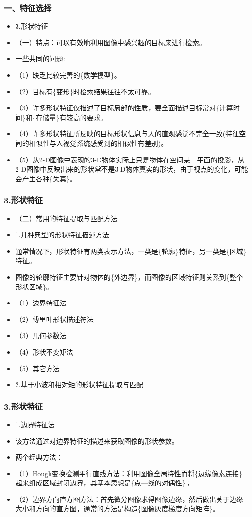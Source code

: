 \documentclass[notheorems,mathserif,table,compress]{beamer}  %
\begin{document}
\begin{frame}
  \frametitle{一、特征选择}
  \begin{itemize}
  \item 3.形状特征
  \item （一）特点：可以有效地利用图像中感兴趣的目标来进行检索。
  \item  一些共同的问题:
  \item （1）缺乏比较完善的\{数学模型\}。
  \item （2）目标有\{变形\}时检索结果往往不太可靠。
  \item （3）许多形状特征仅描述了目标局部的性质，要全面描述目标常对\{计算时间\}和\{存储量\}有较高的要求。
  \item （4）许多形状特征所反映的目标形状信息与人的直观感觉不完全一致(特征空间的相似性与人视觉系统感受到的相似性有差别)。  
  \item （5）从2-D图像中表现的3-D物体实际上只是物体在空间某一平面的投影，从2-D图像中反映出来的形状常不是3-D物体真实的形状，由于视点的变化，可能会产生各种\{失真\}。
  \end{itemize}
\end{frame}

\begin{frame}
  \frametitle{3.形状特征}
  \begin{itemize}
  \item （二）常用的特征提取与匹配方法
  \item  1.几种典型的形状特征描述方法  
  \item  通常情况下，形状特征有两类表示方法，一类是\{轮廓\}特征，另一类是\{区域\}特征。
  \item  图像的轮廓特征主要针对物体的\{外边界\}，而图像的区域特征则关系到\{整个形状区域\}。
  \item （1）边界特征法  
  \item （2）傅里叶形状描述符法 
  \item （3）几何参数法 
  \item （4）形状不变矩法 
  \item （5）其它方法  
  \item  2.基于小波和相对矩的形状特征提取与匹配
  \end{itemize}
\end{frame}

\begin{frame}
  \frametitle{3.形状特征}
  \begin{itemize}
  \item 1.边界特征法
  \item 该方法通过对边界特征的描述来获取图像的形状参数。
  \item 两个经典方法：
  \item（1）Hough变换检测平行直线方法：利用图像全局特性而将\{边缘像素连接\}起来组成区域封闭边界，其基本思想是\{点—线的对偶性\}；
  \item（2）边界方向直方图方法：首先微分图像求得图像边缘，然后做出关于边缘大小和方向的直方图，通常的方法是构造\{图像灰度梯度方向矩阵\}。
  \end{itemize}
\end{frame}
\end{document}
